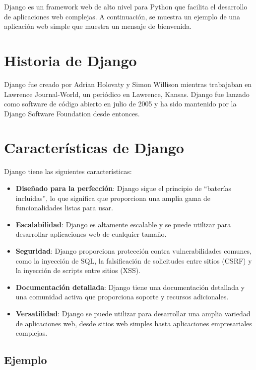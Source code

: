 \documentclass[
  a4paper,
  DIV=11,
  numbers=noendperiod,
  onepage,
  openany]{scrreprt}
\begin{document}
Django es un framework web de alto nivel para Python que facilita el
desarrollo de aplicaciones web complejas. A continuación, se muestra un
ejemplo de una aplicación web simple que muestra un mensaje de
bienvenida.

\chapter{Historia de Django}\label{historia-de-django}

Django fue creado por Adrian Holovaty y Simon Willison mientras
trabajaban en Lawrence Journal-World, un periódico en Lawrence, Kansas.
Django fue lanzado como software de código abierto en julio de 2005 y ha
sido mantenido por la Django Software Foundation desde entonces.

\chapter{Características de Django}\label{caracteruxedsticas-de-django}

Django tiene las siguientes características:

\begin{itemize}
\item
  \textbf{Diseñado para la perfección}: Django sigue el principio de
  ``baterías incluidas'', lo que significa que proporciona una amplia
  gama de funcionalidades listas para usar.
\item
  \textbf{Escalabilidad}: Django es altamente escalable y se puede
  utilizar para desarrollar aplicaciones web de cualquier tamaño.
\item
  \textbf{Seguridad}: Django proporciona protección contra
  vulnerabilidades comunes, como la inyección de SQL, la falsificación
  de solicitudes entre sitios (CSRF) y la inyección de scripts entre
  sitios (XSS).
\item
  \textbf{Documentación detallada}: Django tiene una documentación
  detallada y una comunidad activa que proporciona soporte y recursos
  adicionales.
\item
  \textbf{Versatilidad}: Django se puede utilizar para desarrollar una
  amplia variedad de aplicaciones web, desde sitios web simples hasta
  aplicaciones empresariales complejas.
\end{itemize}

\section{Ejemplo}\label{ejemplo-4}
\end{document}
